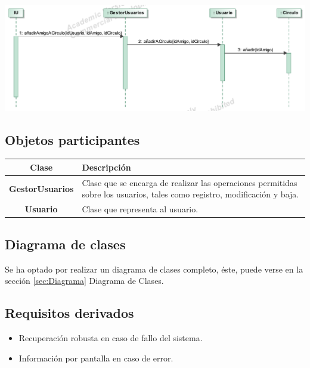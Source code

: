 \documentclass[12pt, a4paper, titlepage]{article}
\begin{document}
\begin{center}
	\includegraphics{Imagenes/OperacionAnadirAmigoACirculo}
\end{center}



\subsection{Objetos participantes}

\begin{center}

\begin{tabular}{|c|p{12cm}|}
	\hline
	\textbf{Clase} & \textbf{Descripción}\\ \hline
	\textbf{GestorUsuarios} &  Clase que se encarga de realizar las operaciones permitidas sobre los usuarios, tales como registro, modificación y baja.\\ \hline
	\textbf{Usuario} & Clase que representa al usuario. \\ \hline
\end{tabular}

\end{center}


\subsection{Diagrama de clases}
Se ha optado por realizar un diagrama de clases completo, éste, puede verse en la sección \ref{sec:Diagrama} Diagrama de Clases.
\subsection{Requisitos derivados}
\begin{itemize}
	\item Recuperación robusta en caso de fallo del sistema.
	\item Información por pantalla en caso de error.
\end{itemize}
\end{document}

